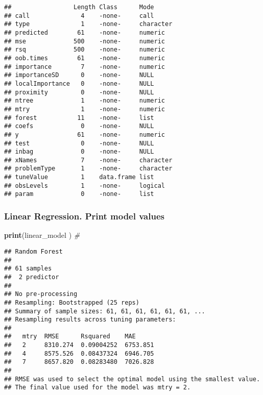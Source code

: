\documentclass[]{article}
\newenvironment{Shaded}{\begin{snugshade}}{\end{snugshade}}
\newcommand{\CommentTok}[1]{\textcolor[rgb]{0.56,0.35,0.01}{\textit{#1}}}
\newcommand{\KeywordTok}[1]{\textcolor[rgb]{0.13,0.29,0.53}{\textbf{#1}}}
\newcommand{\NormalTok}[1]{#1}
\begin{document}
\begin{verbatim}
##                 Length Class      Mode     
## call              4    -none-     call     
## type              1    -none-     character
## predicted        61    -none-     numeric  
## mse             500    -none-     numeric  
## rsq             500    -none-     numeric  
## oob.times        61    -none-     numeric  
## importance        7    -none-     numeric  
## importanceSD      0    -none-     NULL     
## localImportance   0    -none-     NULL     
## proximity         0    -none-     NULL     
## ntree             1    -none-     numeric  
## mtry              1    -none-     numeric  
## forest           11    -none-     list     
## coefs             0    -none-     NULL     
## y                61    -none-     numeric  
## test              0    -none-     NULL     
## inbag             0    -none-     NULL     
## xNames            7    -none-     character
## problemType       1    -none-     character
## tuneValue         1    data.frame list     
## obsLevels         1    -none-     logical  
## param             0    -none-     list
\end{verbatim}

\hypertarget{linear-regression.-print-model-values}{%
\subsubsection{Linear Regression. Print model
values}\label{linear-regression.-print-model-values}}

\begin{Shaded}
\begin{Highlighting}[]
\KeywordTok{print}\NormalTok{(linear_model )  }\CommentTok{# }
\end{Highlighting}
\end{Shaded}

\begin{verbatim}
## Random Forest 
## 
## 61 samples
##  2 predictor
## 
## No pre-processing
## Resampling: Bootstrapped (25 reps) 
## Summary of sample sizes: 61, 61, 61, 61, 61, 61, ... 
## Resampling results across tuning parameters:
## 
##   mtry  RMSE      Rsquared    MAE     
##   2     8310.274  0.09004252  6753.851
##   4     8575.526  0.08437324  6946.705
##   7     8657.820  0.08283480  7026.828
## 
## RMSE was used to select the optimal model using the smallest value.
## The final value used for the model was mtry = 2.
\end{verbatim}
\end{document}
